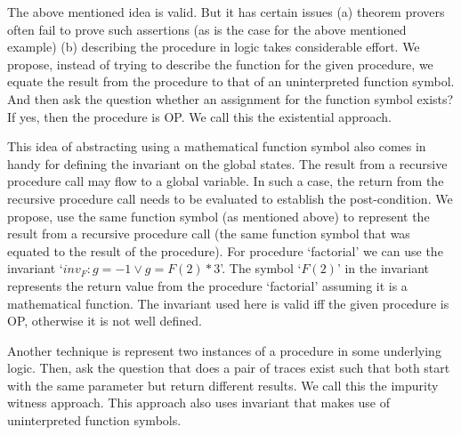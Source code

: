 \documentclass{llncs}
\newcommand{\inv}{\mathit{inv}}
\newcommand{\F}{\mathit{F}}
\begin{document}
The above mentioned idea is valid. But it has certain issues (a)
theorem provers often fail to prove such assertions (as is the case
for the above mentioned example) (b) describing the procedure in logic
takes considerable effort. We propose, instead of trying to describe
the function for the given procedure, we equate the result from the
procedure to that of an uninterpreted function symbol. And then ask
the question whether an assignment for the function symbol exists? If
yes, then the procedure is OP. We call this the existential approach.

This idea of abstracting using a mathematical function symbol also
comes in handy for defining the invariant on the global states. The
result from a recursive procedure call may flow to a global
variable. In such a case, the return from the recursive procedure call
needs to be evaluated to establish the post-condition. We propose, use
the same function symbol (as mentioned above) to represent the result
from a recursive procedure call (the same function symbol that
was equated to the result of the procedure). For procedure `factorial'
we can use the invariant `$\inv_{\F} : g = -1 \vee g = \F(2) *
3$'. The symbol `$\F(2)$' in the invariant represents the return value
from the procedure `factorial' assuming it is a mathematical
function. The invariant used here is valid iff the given procedure is
OP, otherwise it is not well defined.


Another technique is represent two instances of a procedure in some
underlying logic. Then, ask the question that does a pair of traces
exist such that both start with the same parameter but return
different results. We call this the impurity witness approach. This
approach also uses invariant that makes use of uninterpreted function
symbols. 

\end{document}
